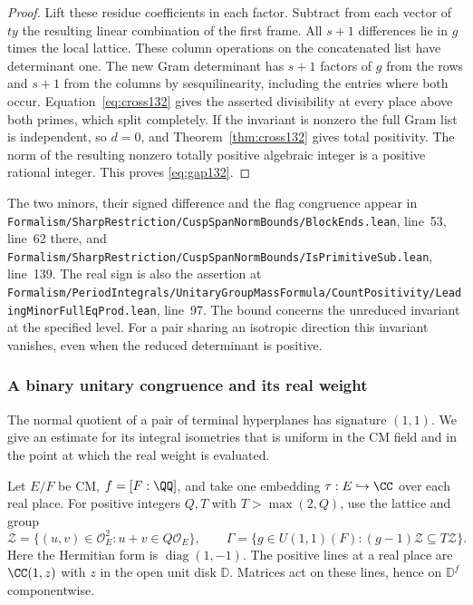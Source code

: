 \documentclass[a4paper,11pt]{article}
\theoremstyle{definition}
\theoremstyle{remark}
\newcommand{\srcloc}[2]{{\small\nolinkurl{#1.lean}}, line~#2}
\numberwithin{equation}{section}
\begin{document}
\begin{proof}
Lift these residue coefficients in each factor. Subtract from
each vector of \(t y\) the resulting linear combination of the
first frame. All \(s+1\) differences lie in \(g\) times the
local lattice. These column operations on the concatenated list
have determinant one. The new Gram determinant has \(s+1\)
factors of \(g\) from the rows and \(s+1\) from the columns
by sesquilinearity, including the entries where both occur.
Equation~\eqref{eq:cross132} gives the asserted divisibility
at every place above both primes, which split completely.
If the invariant is nonzero the full Gram list is independent,
so \(d=0\), and Theorem~\ref{thm:cross132} gives total positivity.
The norm of the resulting nonzero totally positive algebraic
integer is a positive rational integer. This proves
\eqref{eq:gap132}.
\end{proof}

The two minors, their signed difference and the flag congruence
appear in \srcloc{Formalism/SharpRestriction/CuspSpanNormBounds/BlockEnds}{53},
line~62 there, and
\srcloc{Formalism/SharpRestriction/CuspSpanNormBounds/IsPrimitiveSub}{139}.
The real sign is also the assertion at
\srcloc{Formalism/PeriodIntegrals/UnitaryGroupMassFormula/CountPositivity/LeadingMinorFullEqProd}{97}.
The bound concerns the unreduced invariant at the specified
level. For a pair sharing an isotropic direction this invariant
vanishes, even when the reduced determinant is positive.

\subsubsection{A binary unitary congruence and its real weight}\label{nav:VII-02}
\label{sub:binary230}

The normal quotient of a pair of terminal hyperplanes has
signature \((1,1)\). We give an estimate for its integral
isometries that is uniform in the CM field and in the point
at which the real weight is evaluated.

Let \(E/F\) be CM, \(f=[F:\QQ]\), and take one embedding
\(\tau:E\hookrightarrow\CC\) over each real place. For
positive integers \(Q,T\) with \(T>\max(2,Q)\), use the
lattice and group
\[
 \mathcal Z=\{(u,v)\in\mathcal O_E^2:u+v\in Q\mathcal O_E\},
 \qquad
 \Gamma=\{g\in U(1,1)(F): (g-1)\mathcal Z\subseteq T\mathcal Z\}.
\]
Here the Hermitian form is \(\operatorname{diag}(1,-1)\).
The positive lines at a real place are \(\CC(1,z)\) with
\(z\) in the open unit disk \(\mathbb D\). Matrices act on
these lines, hence on \(\mathbb D^f\) componentwise.
\end{document}
